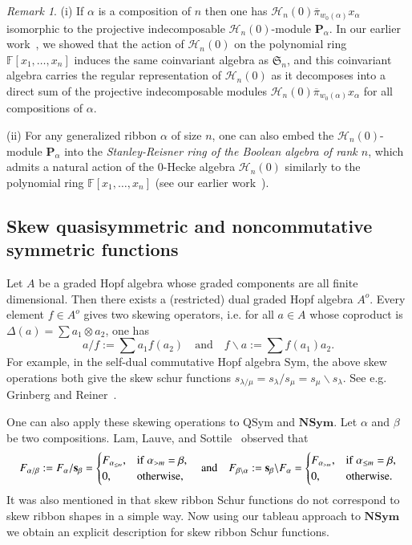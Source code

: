 \documentclass{amsart}
\newtheorem*{Young's Rule}{Young's Rule}
\theoremstyle{definition}
\theoremstyle{remark}
\newtheorem{remark}[theorem]{Remark}
\numberwithin{equation}{section}
\begin{document}
\begin{remark}
(i) If $\alpha$ is a composition of $n$ then one has ${\mathcal{H}}_n(0) {\overline{\pi}}_{w_0(\alpha)} x_{\alpha}$ isomorphic to the projective indecomposable ${\mathcal{H}}_n(0)$-module ${\mathbf{P}}_\alpha$. In our earlier work~\cite{H0CF}, we showed that the action of ${\mathcal{H}}_n(0)$ on the polynomial ring ${{\mathbb F}}[x_1,\ldots,x_n]$ induces the same coinvariant algebra as ${{\mathfrak S}}_n$, and this coinvariant algebra carries the regular representation of ${\mathcal{H}}_n(0)$ as it decomposes into a direct sum of the projective indecomposable modules ${\mathcal{H}}_n(0) {\overline{\pi}}_{w_0(\alpha)} x_{\alpha}$ for all compositions of $\alpha$.

\noindent(ii)  For any generalized ribbon $\alpha$ of size $n$, one can also embed the ${\mathcal{H}}_n(0)$-module ${\mathbf{P}}_\alpha$ into the \emph{Stanley-Reisner ring of the Boolean algebra of rank $n$}, which admits a natural action of the 0-Hecke algebra ${\mathcal{H}}_n(0)$ similarly to the polynomial ring ${{\mathbb F}}[x_1,\ldots,x_n]$ (see our earlier work~\cite{H0SR}).
\end{remark}

\subsection{Skew quasisymmetric and noncommutative symmetric functions}\label{sec:skew}
Let $A$ be a graded Hopf algebra whose graded components are all finite dimensional. Then there exists a (restricted) dual graded Hopf algebra $A^o$. Every element $f\in A^o$ gives two skewing operators, i.e. for all $a\in A$ whose coproduct is $\Delta(a)=\sum a_1\otimes a_2$, one has
\[
a/f:=\sum a_1f(a_2) {\quad\text{and}\quad} f\backslash a:=\sum f(a_1)a_2.
\]
For example, in the self-dual commutative Hopf algebra ${\mathrm{Sym}}$, the above skew operations both give the skew schur functions $s_{\lambda/\mu}=s_\lambda/s_\mu=s_\mu\backslash s_\lambda$. See e.g. Grinberg and Reiner~\cite[\S2.8]{GrinbergReiner}.

One can also apply these skewing operations to ${\mathrm{QSym}}$ and ${\mathbf{NSym}}$. Let $\alpha$ and $\beta$ be two compositions. Lam, Lauve, and Sottile~\cite[\S5]{Skew} observed that 
\[ F_{\alpha/\beta}:= F_\alpha / {{\mathbf s}}_\beta = 
\begin{cases}
F_{\alpha_{\leq m}}, & {\rm if}\ \alpha_{>m}=\beta, \\
0, & \textrm{otherwise,}
\end{cases}
{\quad\text{and}\quad}
F_{\beta\backslash\alpha}:= {{\mathbf s}}_\beta  \backslash F_\alpha = 
\begin{cases}
F_{\alpha_{>m}}, & {\rm if}\ \alpha_{\leq m}=\beta, \\
0, & \textrm{otherwise.}
\end{cases} \]
It was also mentioned in \cite{Skew} that skew ribbon Schur functions do not correspond to skew ribbon shapes in a simple way. Now using our tableau approach to ${\mathbf{NSym}}$ we obtain an explicit description for skew ribbon Schur functions. 
\end{document}
